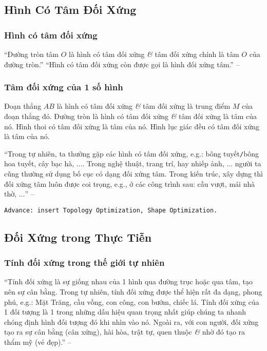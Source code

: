 \documentclass{article}
\numberwithin{equation}{section}
\begin{document}
\subsection{Hình Có Tâm Đối Xứng}

\subsubsection{Hình có tâm đối xứng}
``Đường tròn tâm $O$ là hình có tâm đối xứng \textit{\&} tâm đối xứng chính là tâm $O$ của đường tròn.'' ``Hình có tâm đối xứng còn được gọi là hình đối xứng tâm.'' -- \cite[p. 111]{SGK_Toan_6_Canh_Dieu_tap_1}

\subsubsection{Tâm đối xứng của 1 số hình}
Đoạn thẳng $AB$ là hình có tâm đối xứng \textit{\&} tâm đối xứng là trung điểm $M$ của đoạn thẳng đó. Đường tròn là hình có tâm đối xứng \textit{\&} tâm đối xứng là tâm của nó. Hình thoi có tâm đối xứng là tâm của nó. Hình lục giác đều có tâm đối xứng là tâm của nó.

``Trong tự nhiên, ta thường gặp các hình có tâm đối xứng, e.g.: bông tuyết\texttt{/}bông hoa tuyết, cây bạc hà, $\ldots$. Trong nghệ thuật, trang trí, hay nhiếp ảnh, $\ldots$ người ta cũng thường sử dụng bố cục có dạng đối xứng tâm. Trong kiến trúc, xây dựng thì đối xứng tâm luôn được coi trọng, e.g., ở các công trình sau: cầu vượt, mái nhà thờ, $\ldots$'' -- \cite[p. 113]{SGK_Toan_6_Canh_Dieu_tap_1}

\texttt{Advance: insert Topology Optimization, Shape Optimization.}


\subsection{Đối Xứng trong Thực Tiễn}

\subsubsection{Tính đối xứng trong thế giới tự nhiên}
``Tính đối xứng là sự giống nhau của 1 hình qua đường trục hoặc qua tâm, tạo nên sự cân bằng. Trong tự nhiên, tính đối xứng được thể hiện rất đa dạng, phong phú, e.g.: Mặt Trăng, cầu vồng, con công, con bướm, chiếc lá. Tính đối xứng của 1 đối tượng là 1 trong những dấu hiệu quan trọng nhất giúp chúng ta nhanh chóng định hình đối tượng đó khi nhìn vào nó. Ngoài ra, với con người, đối xứng tạo ra sự cân bằng (cân xứng), hài hòa, trật tự, quen thuộc \textit{\&} nhờ đó tạo ra thẩm mỹ (vẻ đẹp).'' -- \cite[p. 114]{SGK_Toan_6_Canh_Dieu_tap_1}
\end{document}

